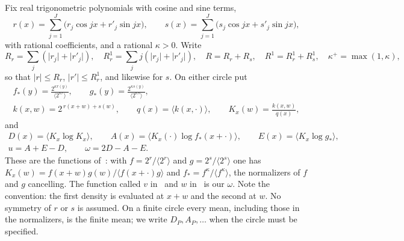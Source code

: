 \documentclass[11pt]{article}
\theoremstyle{definition}
\newcommand{\abs}[1]{\lvert #1\rvert}
\newcommand{\av}[1]{\langle #1\rangle}
\begin{document}
Fix real trigonometric polynomials with cosine and sine terms,
\[
 r(x)=\sum_{j=1}^{J}\bigl(r_j\cos jx+r'_j\sin jx\bigr),\qquad s(x)=\sum_{j=1}^{J}\bigl(s_j\cos jx+s'_j\sin jx\bigr),
\]
with rational coefficients, and a rational $\kappa>0$. Write
\[
 R_r=\sum_j(\abs{r_j}+\abs{r'_j}),\quad R^1_r=\sum_jj(\abs{r_j}+\abs{r'_j}),\quad R=R_r+R_s,\quad R^1=R^1_r+R^1_s,\quad \kappa^+=\max(1,\kappa),
\]
so that $\abs r\le R_r$, $\abs{r'}\le R^1_r$, and likewise for $s$. On either circle put
\begin{equation}\label{eq:fg}
\begin{gathered}
 f_\ast(y)=\frac{2^{\kappa r(y)}}{\av{2^{\kappa r}}},\qquad g_\ast(y)=\frac{2^{\kappa s(y)}}{\av{2^{\kappa s}}},\\
 k(x,w)=2^{\,r(x+w)+s(w)},\qquad q(x)=\av{k(x,\cdot)},\qquad K_x(w)=\frac{k(x,w)}{q(x)},
\end{gathered}
\end{equation}
and
\begin{equation}\label{eq:DAE}
\begin{gathered}
 D(x)=\av{K_x\log K_x},\qquad A(x)=\av{K_x(\cdot)\log f_\ast(x+\cdot)},\qquad E(x)=\av{K_x\log g_\ast},\\
 u=A+E-D,\qquad \omega=2D-A-E .
\end{gathered}
\end{equation}
These are the functions of~\cite[Section~3]{OAI}: with $f=2^r/\av{2^r}$ and $g=2^s/\av{2^s}$ one has
$K_x(w)=f(x+w)g(w)/\av{f(x+\cdot)g}$ and $f_\ast=f^\kappa/\av{f^\kappa}$, the normalizers of $f$ and $g$ cancelling.
The function called $v$ in~\cite{OAI} and $w$ in~\cite{Base} is our $\omega$. Note the convention: the first density
is evaluated at $x+w$ and the second at $w$. No symmetry of $r$ or $s$ is assumed. On a finite circle every mean,
including those in the normalizers, is the finite mean; we write $D_P,A_P,\dots$ when the circle must be specified.
\end{document}
